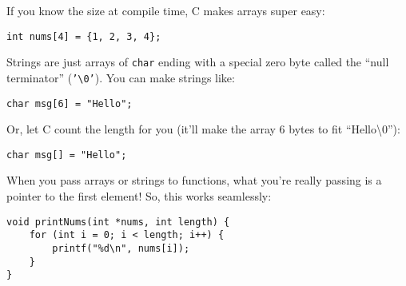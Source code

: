 \documentclass[12pt]{article}
\begin{document}
If you know the size at compile time, C makes arrays super easy:

\begin{verbatim}
int nums[4] = {1, 2, 3, 4};
\end{verbatim}

Strings are just arrays of \texttt{char} ending with a special zero byte called the ``null terminator'' (\texttt{'\textbackslash0'}). You can make strings like:

\begin{verbatim}
char msg[6] = "Hello";
\end{verbatim}

Or, let C count the length for you (it’ll make the array 6 bytes to fit “Hello\textbackslash0”):

\begin{verbatim}
char msg[] = "Hello";
\end{verbatim}

When you pass arrays or strings to functions, what you’re really passing is a pointer to the first element! So, this works seamlessly:

\begin{verbatim}
void printNums(int *nums, int length) {
    for (int i = 0; i < length; i++) {
        printf("%d\n", nums[i]);
    }
}
\end{verbatim}
\end{document}
